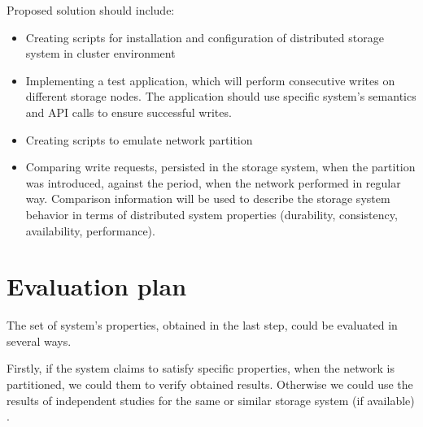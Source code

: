 \documentclass[a4paper]{article}
\begin{document}
Proposed solution should include:
\begin{itemize}
	\item Creating scripts for installation and configuration of distributed storage system in cluster environment
	\item Implementing a test application, which will perform consecutive writes on different storage nodes. The application should use specific system's semantics and API calls to ensure successful writes.
	\item Creating scripts to emulate network partition  
	\item Comparing write requests, persisted in the storage system, when the partition was introduced, against the period, when the network performed in regular way. Comparison information will be used to describe the storage system behavior in terms of distributed system properties (durability, consistency, availability, performance).
\end{itemize}

\section*{Evaluation plan}

The set of system's properties, obtained in the last step, could be evaluated in several ways.

Firstly, if the system claims to satisfy specific properties, when the network is partitioned, we could them to verify obtained results.
Otherwise we could use the results of independent studies for the same or similar storage system (if available) \cite{jepsen}.

\printbibliography
\end{document}
